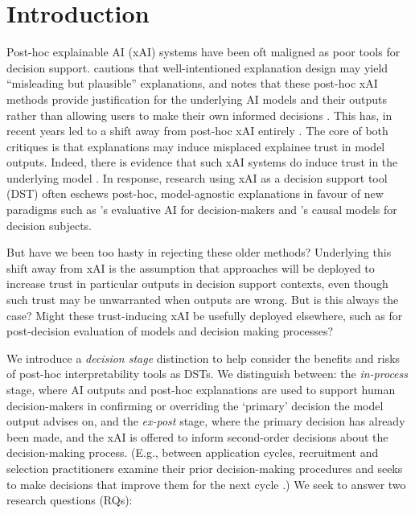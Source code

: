 \minitoc

\section{Introduction}
Post-hoc explainable AI (xAI) systems have been oft maligned as poor tools for decision support. \textcite{Lipton} cautions that well-intentioned explanation design may yield ``misleading but plausible'' explanations, and \textcite{Miller_2023} notes that these post-hoc xAI methods provide justification for the underlying AI models and their outputs rather than allowing users to make their own informed decisions \cite{Miller_2023}. This has, in recent years led to a shift away from post-hoc xAI entirely \cite{Lipton,Miller_2023,kumar_problems_2020,Bastounis_Campodonico_vanderSchaar_Adcock_Hansen_2024}. The core of both critiques is that explanations may induce misplaced explainee trust in model outputs. Indeed, there is evidence that such xAI systems do induce trust in the underlying model \cite{Lai-and-Tan,Jacobs-et-al}. In response, research using xAI as a decision support tool (DST) often eschews post-hoc, model-agnostic explanations in favour of new paradigms such as \textcite{Miller_2023}'s evaluative AI for decision-makers and \textcite{Karimi_Schölkopf_Valera_2021}'s causal models for decision subjects.

But have we been too hasty in rejecting these older methods? Underlying this shift away from xAI is the assumption that approaches will be deployed to increase trust in particular outputs in decision support contexts, even though such trust may be unwarranted when outputs are wrong. But is this always the case? Might these trust-inducing xAI be usefully deployed elsewhere, such as for post-decision evaluation of models and decision making processes?

We introduce a \emph{decision stage} distinction to help consider the benefits and risks of post-hoc interpretability tools as DSTs. We distinguish between: the \emph{in-process} stage, where AI outputs and post-hoc explanations are used to support human decision-makers in confirming or overriding the `primary' decision the model output advises on, and the \emph{ex-post} stage, where the primary decision has already been made, and the xAI is offered to inform second-order decisions about the decision-making process. (E.g., between application cycles, recruitment and selection practitioners examine their prior decision-making procedures and seeks to make decisions that improve them for the next cycle \cite{li2020hiring}.) We seek to answer two research questions (RQs):

